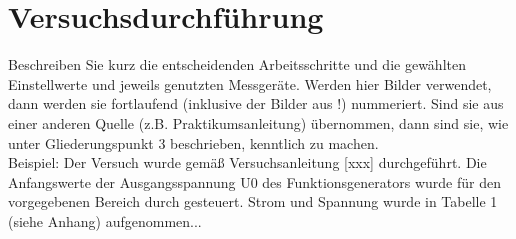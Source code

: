 \section{Versuchsdurchführung}
Beschreiben Sie kurz die entscheidenden Arbeitsschritte und die gewählten Einstellwerte und jeweils genutzten Messgeräte. Werden hier Bilder verwendet, dann werden sie fortlaufend (inklusive der Bilder aus !) nummeriert. Sind sie aus einer anderen Quelle (z.B. Praktikumsanleitung) übernommen, dann sind sie, wie unter Gliederungspunkt 3 beschrieben, kenntlich zu machen.\\

Beispiel: \glqq Der Versuch wurde gemäß Versuchsanleitung [xxx] durchgeführt. Die Anfangswerte der Ausgangsspannung U0 des Funktionsgenerators wurde für den vorgegebenen Bereich durch gesteuert. Strom und Spannung wurde in Tabelle 1 (siehe Anhang) aufgenommen...\grqq{}
